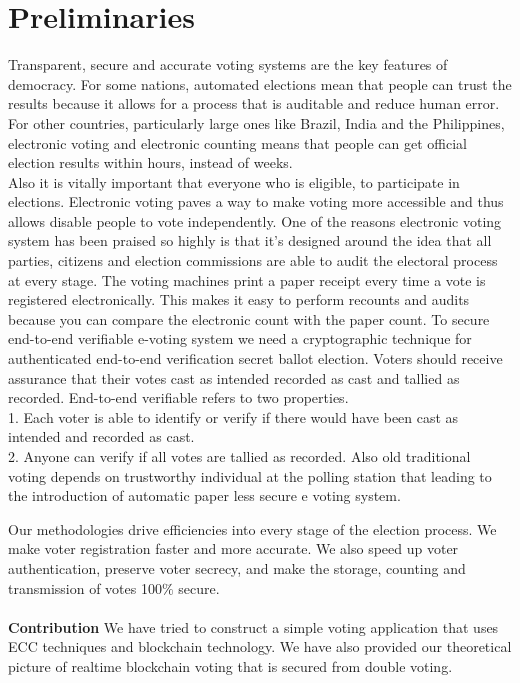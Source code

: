 \documentclass{article}
\begin{document}
\section{Preliminaries}
 Transparent, secure and accurate voting systems are the key features of democracy. For some nations, automated elections mean that people can trust the results because it allows for a process that is auditable and reduce human error. For other countries, particularly large ones like Brazil, India and the Philippines, electronic voting and electronic counting means that people can get official election results within hours, instead of weeks. \\
Also it is vitally important that everyone who is eligible, to participate in elections. Electronic voting paves a way to make voting more accessible and thus allows disable people to vote independently.
One of the reasons electronic voting system has been praised so highly is that it’s designed around the idea that all parties, citizens and election commissions are able to audit the electoral process at every stage. The voting machines print a paper receipt every time a vote is registered electronically. This makes it easy to perform recounts and audits because you can compare the electronic count with the paper count.\cite{WinNT}
To secure end-to-end verifiable e-voting system we need a cryptographic technique for authenticated end-to-end verification secret ballot election. Voters should receive assurance that their votes cast as intended recorded as cast and tallied as recorded. End-to-end verifiable refers to two properties. \\
1. Each voter is able to identify or verify if there would have been cast as intended and recorded as cast. \\
2. Anyone can verify if all votes are tallied as recorded. Also old traditional voting depends on trustworthy individual at the polling station that leading to the introduction of automatic paper less secure e voting system.


Our methodologies drive efficiencies into every stage of the election process. We make voter registration faster and more accurate. We also speed up voter authentication, preserve voter secrecy, and make the storage, counting and transmission of votes 100$ \% $ secure.\\
\\
\textbf{Contribution} We have tried to construct a simple voting application that uses ECC techniques and blockchain technology. We have also provided our theoretical picture of realtime blockchain voting that is secured from double voting.
\end{document}
